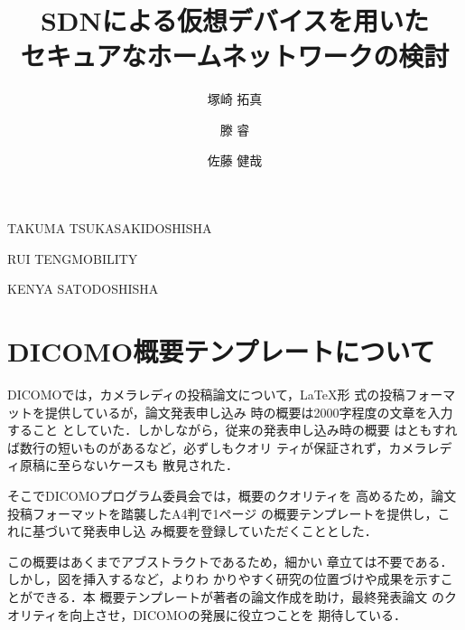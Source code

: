 \documentclass[Japanese]{dicomopapers}
\begin{document}
\title{SDNによる仮想デバイスを用いた\\セキュアなホームネットワークの検討}



\author{塚崎 拓真}{TAKUMA TSUKASAKI}{DOSHISHA}
\author{滕 睿}{RUI TENG}{MOBILITY}
\author{佐藤 健哉}{KENYA SATO}{DOSHISHA}

\maketitle

\section{DICOMO概要テンプレートについて}
DICOMOでは，カメラレディの投稿論文について，\LaTeX 形
式の投稿フォーマットを提供しているが，論文発表申し込み
時の概要は2000字程度の文章を入力すること
としていた．しかしながら，従来の発表申し込み時の概要
はともすれば数行の短いものがあるなど，必ずしもクオリ
ティが保証されず，カメラレディ原稿に至らないケースも
散見された．

そこでDICOMOプログラム委員会では，概要のクオリティを
高めるため，論文投稿フォーマットを踏襲したA4判で1ページ
の概要テンプレートを提供し，これに基づいて発表申し込
み概要を登録していただくこととした．

この概要はあくまでアブストラクトであるため，細かい
章立ては不要である．しかし，図を挿入するなど，よりわ
かりやすく研究の位置づけや成果を示すことができる．本
概要テンプレートが著者の論文作成を助け，最終発表論文
のクオリティを向上させ，DICOMOの発展に役立つことを
期待している．
\end{document}
